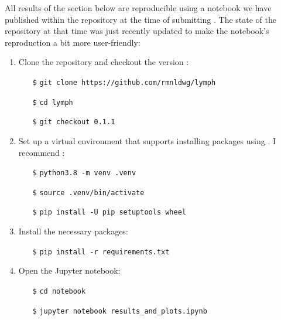 \begin{tcolorbox}[
    title=\faIcon{recycle} Reproducibility,
    parbox=false,
    float
]
    All results of the section below are reproducible using a notebook we have published within the  repository at the time of submitting \cite{ludwig_hidden_2021}. The state of the repository at that time was just recently updated to make the notebook's reproduction a bit more user-friendly:

    \begin{enumerate}
        \item Clone the  repository and checkout the version :
        \begin{itemize}[leftmargin=10mm]
            \setlength\itemsep{-0.5em}
            \item[\texttt{\$}] \verb|git clone https://github.com/rmnldwg/lymph|
            \item[\texttt{\$}] \verb|cd lymph|
            \item[\texttt{\$}] \verb|git checkout 0.1.1|
        \end{itemize}

        \item Set up a virtual environment that supports installing packages using . I recommend :
        \begin{itemize}[leftmargin=10mm]
            \setlength\itemsep{-0.5em}
            \item[\texttt{\$}] \verb|python3.8 -m venv .venv|
            \item[\texttt{\$}] \verb|source .venv/bin/activate|
            \item[\texttt{\$}] \verb|pip install -U pip setuptools wheel|
        \end{itemize}

        \item Install the necessary packages:
        \begin{itemize}[leftmargin=10mm]
            \setlength\itemsep{-0.5em}
            \item[\texttt{\$}] \verb|pip install -r requirements.txt|
        \end{itemize}

        \item Open the Jupyter notebook:
        \begin{itemize}[leftmargin=10mm]
            \setlength\itemsep{-0.5em}
            \item[\texttt{\$}] \verb|cd notebook|
            \item[\texttt{\$}] \verb|jupyter notebook results_and_plots.ipynb|
        \end{itemize}
    \end{enumerate}


\end{tcolorbox}

